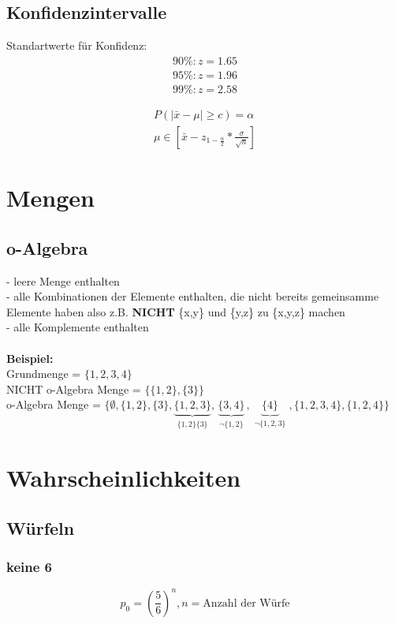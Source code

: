 \documentclass{article}
\begin{document}
	\subsection{Konfidenzintervalle}
	Standartwerte für Konfidenz:
	\begin{align*}
	90\%:z = 1.65\\
	95\%:z = 1.96\\
	99\%:z = 2.58
	\end{align*}
	
	\begin{align}
	P(|\bar{x}-\mu| \geq c) = \alpha \\
	\mu \in [\bar{x} - z_{1-\frac{\alpha}{2}} * \frac{\sigma}{\sqrt{n}}]
	\end{align}
	
	\section{Mengen}
	\subsection{o-Algebra}
	- leere Menge enthalten\\
	- alle Kombinationen der Elemente enthalten, die nicht bereits gemeinsamme Elemente haben also z.B. \textbf{NICHT} \{x,y\} und \{y,z\} zu \{x,y,z\} machen\\
	- alle Komplemente enthalten\\ \\
	\textbf{Beispiel:}\\
	Grundmenge = $\{1,2,3,4\}$\\
	NICHT o-Algebra Menge = $\{\{1,2\},\{3\}\}$\\
	o-Algebra Menge = $\{\emptyset ,\{1,2\},\{3\},
	\underbrace{\{1,2,3\}}_{\substack{\{1,2\}\{3\}}},
	\underbrace{\{3,4\}}_{\substack{\neg \{1,2\}}},
	\underbrace{\{4\}}_{\substack{\neg \{1,2,3\}}},
	\{1,2,3,4\},\{1,2,4\}\}$
	
	\section{Wahrscheinlichkeiten}
	\subsection{Würfeln}
	\subsubsection{keine 6}
	\[
	p_0 = \left( \frac{5}{6} \right)^n , n = \text{Anzahl der Würfe}
	\]
\end{document}
